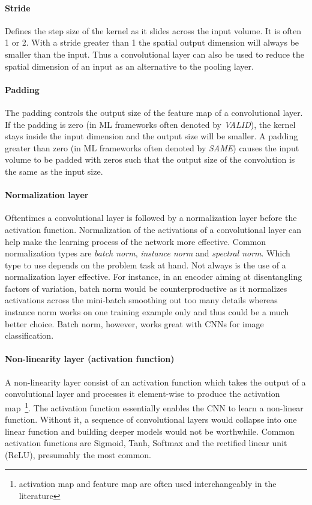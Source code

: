 \documentclass[12pt,a4paper]{article}
\begin{document}
\paragraph{Stride                   } Defines the step size of the kernel as it slides across the input volume. It is often 1 or 2. With a stride greater than 1 the spatial output dimension will always be smaller than the input. Thus a convolutional layer can also be used to reduce the spatial dimension of an input as an alternative to the pooling layer.

\paragraph{Padding					} The padding controls the output size of the feature map of a convolutional layer. If the padding is zero (in ML frameworks often denoted by \textit{VALID}), the kernel stays inside the input dimension and the output size will be smaller. A padding greater than zero (in ML frameworks often denoted by \textit{SAME}) causes the input volume to be padded with zeros such that the output size of the convolution is the same as the input size.

\paragraph{Normalization layer      } Oftentimes a convolutional layer is followed by a normalization layer before the activation function. Normalization of the activations of a convolutional layer can help make the learning process of the network more effective. Common normalization types are \textit{batch norm}, \textit{instance norm} and \textit{spectral norm}. Which type to use depends on the problem task at hand. Not always is the use of a normalization layer effective. For instance, in an encoder aiming at disentangling factors of variation, batch norm would be counterproductive as it normalizes activations across the mini-batch smoothing out too many details whereas instance norm works on one training example only and thus could be a much better choice. Batch norm, however, works great with CNNs for image classification.

\paragraph{Non-linearity layer (activation function)} A non-linearity layer consist of an activation function which takes the output of a convolutional layer and processes it element-wise to produce the activation map~\footnote{activation map and feature map are often used interchangeably in the literature}. The activation function essentially enables the CNN to learn a non-linear function. Without it, a sequence of convolutional layers would collapse into one linear function and building deeper models would not be worthwhile. Common activation functions are Sigmoid, Tanh, Softmax and the rectified linear unit (ReLU), presumably the most common. 
\end{document}
